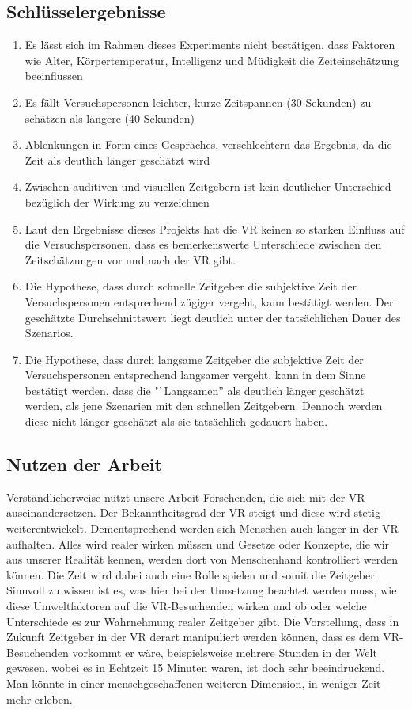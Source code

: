 \documentclass{Bericht}
\begin{document}
\subsection{Schlüsselergebnisse}
	\begin{enumerate}
		\item Es lässt sich im Rahmen dieses Experiments nicht bestätigen, dass Faktoren wie Alter, Körpertemperatur, Intelligenz und Müdigkeit die Zeiteinschätzung beeinflussen
		\item Es fällt Versuchspersonen leichter, kurze Zeitspannen (30 Sekunden) zu schätzen als längere (40 Sekunden)
		\item Ablenkungen in Form eines Gespräches, verschlechtern das Ergebnis, da die Zeit als deutlich länger geschätzt wird 
		\item Zwischen auditiven und visuellen Zeitgebern ist kein deutlicher Unterschied bezüglich der Wirkung zu verzeichnen
		\item Laut den Ergebnisse dieses Projekts hat die VR keinen so starken Einfluss auf die Versuchspersonen, dass es bemerkenswerte Unterschiede zwischen den Zeitschätzungen vor und nach der VR gibt.
		\item Die Hypothese, dass durch schnelle Zeitgeber die subjektive Zeit der Versuchspersonen entsprechend zügiger vergeht, kann bestätigt werden. Der geschätzte Durchschnittswert liegt  deutlich unter der tatsächlichen Dauer des Szenarios.
		\item Die Hypothese, dass durch langsame Zeitgeber die subjektive Zeit der Versuchspersonen entsprechend langsamer vergeht, kann in dem Sinne bestätigt werden, dass die "`Langsamen'' als deutlich länger geschätzt werden, als jene Szenarien mit den schnellen Zeitgebern. Dennoch werden diese nicht länger geschätzt als sie tatsächlich gedauert haben.
	\end{enumerate}

\subsection{Nutzen der Arbeit}
Verständlicherweise nützt unsere Arbeit Forschenden, die sich mit der VR auseinandersetzen. Der Bekanntheitsgrad der VR steigt und diese wird stetig weiterentwickelt. Dementsprechend werden sich Menschen auch länger in der VR aufhalten. Alles wird realer wirken müssen und Gesetze oder Konzepte, die wir aus unserer Realität kennen, werden dort von Menschenhand kontrolliert werden können. Die Zeit wird dabei auch eine Rolle spielen und somit die Zeitgeber. Sinnvoll zu wissen ist es, was hier bei der Umsetzung beachtet werden muss, wie diese Umweltfaktoren auf die VR-Besuchenden wirken und ob oder welche Unterschiede es zur Wahrnehmung realer Zeitgeber gibt. Die Vorstellung, dass in Zukunft Zeitgeber in der VR derart manipuliert werden können, dass es dem VR-Besuchenden vorkommt er wäre, beispielsweise mehrere Stunden in der Welt gewesen, wobei es in Echtzeit 15 Minuten waren, ist doch sehr beeindruckend. Man könnte in einer menschgeschaffenen weiteren Dimension, in weniger Zeit mehr erleben.
\end{document}
